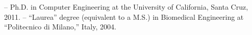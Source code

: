 -- Ph.D. in Computer Engineering at the University of California, Santa Cruz, 2011.
-- ``Laurea'' degree (equivalent to a M.S.) in Biomedical Engineering at ``Politecnico di Milano,'' Italy, 2004.